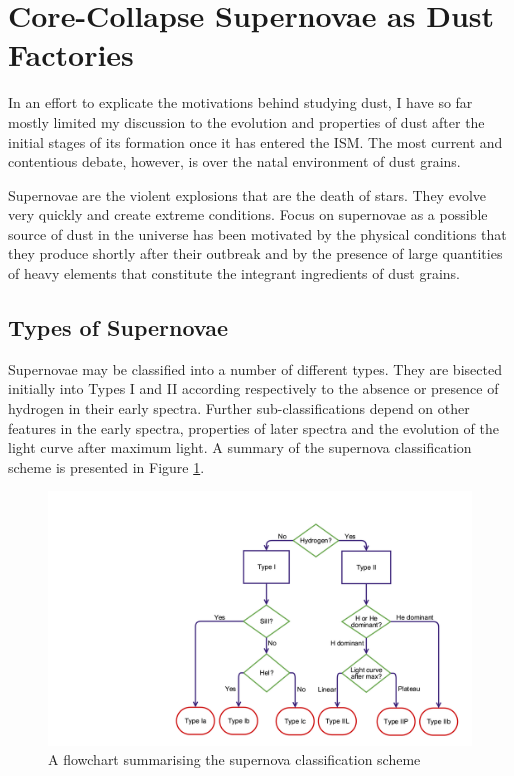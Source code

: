 \section{Core-Collapse Supernovae as Dust Factories}

In an effort to explicate the motivations behind studying dust, I have so far mostly limited my discussion to the evolution and properties of dust after the initial stages of its formation once it has entered the ISM.  The most current and contentious debate, however, is over the natal environment of dust grains.  

Supernovae are the violent explosions that are the death of stars.  They evolve very quickly and create extreme conditions.  Focus on supernovae as a possible source of dust in the universe has been motivated by the physical conditions that they produce shortly after their outbreak and by the presence of large quantities of heavy elements that constitute the integrant ingredients of dust grains.


\subsection{Types of Supernovae}

Supernovae may be classified into a number of different types.  They are bisected initially into Types I and II according respectively to the absence or presence of hydrogen in their early spectra.  Further sub-classifications depend on  other features in the early spectra, properties of later spectra and the evolution of the  light curve after maximum light.  A summary of the supernova classification scheme is presented in Figure \ref{intro:fig:sn_class}.  

\begin{figure}
\centering
\includegraphics[clip=true, scale = 0.2, trim= 930 50 55 210]{chapters/chapter1/figs/sn_classification.png}
\caption{A flowchart summarising the supernova classification scheme}
\label{intro:fig:sn_class}
\end{figure}

